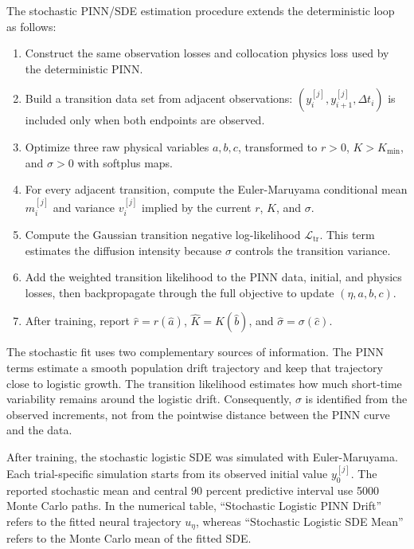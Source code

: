 \documentclass[11pt]{article}
\begin{document}
The stochastic PINN/SDE estimation procedure extends the deterministic loop as
follows:
\begin{enumerate}
  \item Construct the same observation losses and collocation physics loss used
        by the deterministic PINN.
  \item Build a transition data set from adjacent observations:
        $(y_i^{[j]},y_{i+1}^{[j]},\Delta t_i)$ is included only when both
        endpoints are observed.
  \item Optimize three raw physical variables $a,b,c$, transformed to
        $r>0$, $K>K_{\min}$, and $\sigma>0$ with softplus maps.
  \item For every adjacent transition, compute the Euler-Maruyama conditional
        mean $m_i^{[j]}$ and variance $v_i^{[j]}$ implied by the current
        $r$, $K$, and $\sigma$.
  \item Compute the Gaussian transition negative log-likelihood
        $\mathcal L_{\mathrm{tr}}$. This term estimates the diffusion
        intensity because $\sigma$ controls the transition variance.
  \item Add the weighted transition likelihood to the PINN data, initial, and
        physics losses, then backpropagate through the full objective to update
        $(\eta,a,b,c)$.
  \item After training, report
        $\widehat r=r(\widehat a)$,
        $\widehat K=K(\widehat b)$, and
        $\widehat\sigma=\sigma(\widehat c)$.
\end{enumerate}

The stochastic fit uses two complementary sources of information. The PINN
terms estimate a smooth population drift trajectory and keep that trajectory
close to logistic growth. The transition likelihood estimates how much
short-time variability remains around the logistic drift. Consequently,
$\sigma$ is identified from the observed increments, not from the pointwise
distance between the PINN curve and the data.

After training, the stochastic logistic SDE was simulated with
Euler-Maruyama. Each trial-specific simulation starts from its observed initial
value $y_0^{[j]}$. The reported stochastic mean and central 90 percent
predictive interval use 5000 Monte Carlo paths. In the numerical table,
``Stochastic Logistic PINN Drift'' refers to the fitted neural trajectory
$u_\eta$, whereas ``Stochastic Logistic SDE Mean'' refers to the Monte Carlo
mean of the fitted SDE.
\end{document}
